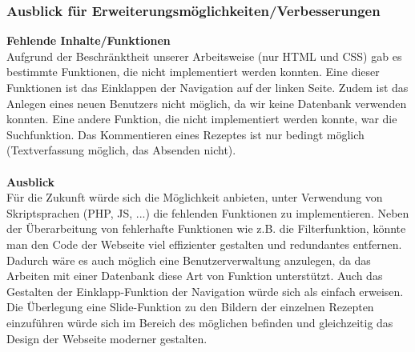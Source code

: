 \documentclass[parskip,10pt,abstracton]{scrartcl}
\begin{document}
\subsubsection*{Ausblick für Erweiterungsmöglichkeiten/Verbesserungen}
\textbf{Fehlende Inhalte/Funktionen}\\
Aufgrund der Beschränktheit unserer Arbeitsweise (nur HTML und CSS) gab es bestimmte Funktionen, die nicht implementiert werden konnten.
Eine dieser Funktionen ist das Einklappen der Navigation auf der linken Seite. Zudem ist das Anlegen eines neuen Benutzers nicht möglich, da wir keine Datenbank verwenden konnten. Eine andere Funktion, die nicht implementiert werden konnte, war die Suchfunktion. Das Kommentieren eines Rezeptes ist nur bedingt möglich (Textverfassung möglich, das Absenden nicht). \\\\
\textbf{Ausblick}\\
Für die Zukunft würde sich die Möglichkeit anbieten, unter Verwendung von Skriptsprachen (PHP, JS, ...) die fehlenden Funktionen zu implementieren. Neben der Überarbeitung von fehlerhafte Funktionen wie z.B. die Filterfunktion, könnte man den Code der Webseite viel effizienter gestalten und redundantes entfernen. Dadurch wäre es auch möglich eine Benutzerverwaltung anzulegen, da das Arbeiten mit einer Datenbank diese Art von Funktion unterstützt.    
Auch das Gestalten der Einklapp-Funktion der Navigation würde sich als einfach erweisen. 
Die Überlegung eine Slide-Funktion zu den Bildern der einzelnen Rezepten einzuführen würde sich im Bereich des möglichen befinden und gleichzeitig das Design der Webseite moderner gestalten. 
\end{document}

